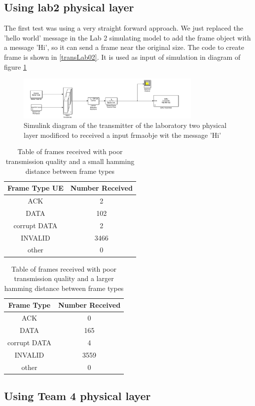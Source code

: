 \subsection{Using lab2 physical layer}
The first test was using a very straight forward approach. We just replaced the 'hello world' message in the Lab 2 
simulating model to add the frame object with a message 'Hi', so it can send a frame near the original size.
The code to create frame is shown in \ref{transLab02}. It is used as input of simulation in diagram of figure \ref{fig:trasmitter_lab02}


\begin{figure}[ht]
    \centering
    \includegraphics[width=0.8\textwidth]{trasmitter_lab02.PNG}
    \caption{Simulink diagram of the transmitter of the laboratory two physical layer modificed to received a input frmaobje wit the message 'Hi' }
    \label{fig:trasmitter_lab02}
\end{figure}

\begin{table}[ht]
	\centering
		\begin{tabular}{| c | c | }
		\hline                       
		Frame Type UE & Number Received\\
		\hline
			ACK & 2\\
			DATA & 102\\
			corrupt DATA & 2\\
			INVALID & 3466\\
			other & 0\\
		\hline
		\end{tabular}
	\caption{Table of frames received with poor transmission quality and a small hamming distance between frame types}
	\label{tab:2ACK}
\end{table}

\begin{table}[ht]
	\centering
		\begin{tabular}{| c | c | }
		\hline                       
		Frame Type & Number Received\\
		\hline
			ACK & 0\\
			DATA & 165\\
			corrupt DATA & 4\\
			INVALID & 3559\\
			other & 0\\
		\hline
		\end{tabular}
	\caption{Table of frames received with poor transmission quality and a larger hamming distance between frame types}
	\label{tab:0ACK}
\end{table}

\subsection{Using Team 4 physical layer}

